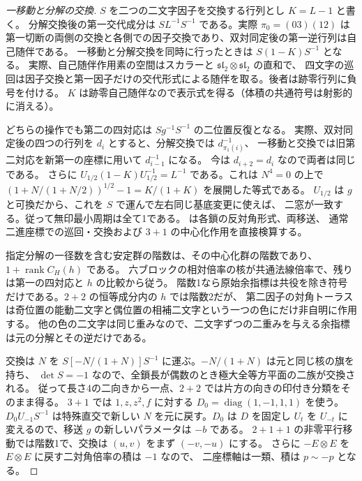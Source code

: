 \begin{proof}[一移動と分解の交換]
$S$ を二つの二文字因子を交換する行列とし $K=L-1$ と書く。
分解交換後の第一交代成分は $S L^{-1}S^{-1}$ である。実際 $\pi_0=(03)(12)$ は
第一切断の両側の交換と各側での因子交換であり、双対同定後の第一逆行列は自己随伴である。
一移動と分解交換を同時に行ったときは $S(1-K)S^{-1}$ となる。
実際、自己随伴作用素の空間はスカラーと $\mathfrak{sl}_2\otimes\mathfrak{sl}_2$ の直和で、
四文字の巡回は因子交換と第一因子だけの交代形式による随伴を取る。後者は跡零行列に負号を付ける。
$K$ は跡零自己随伴なので表示式を得る（体積の共通符号は射影的に消える）。

どちらの操作でも第二の四対応は $Sg^{-1}S^{-1}$ の二位置反復となる。
実際、双対同定後の四つの行列を $d_i$ とすると、分解交換では $d_{\pi_1(i)}^{-1}$、
一移動と交換では旧第二対応を新第一の座標に用いて $d_{i-1}^{-1}$ になる。
今は $d_{i+2}=d_i$ なので両者は同じである。
さらに $U_{1/2}(1-K)U_{1/2}^{-1}=L^{-1}$ である。これは $N^4=0$ の上で
$(1+N/(1+N/2))^{1/2}-1=K/(1+K)$ を展開した等式である。
$U_{1/2}$ は $g$ と可換だから、これを $S$ で運んで左右同じ基底変更に使えば、
二窓が一致する。従って無印最小周期は全て1である。
 は各鎖の反対角形式、両移送、
通常二進座標での巡回・交換および $3+1$ の中心化作用を直接検算する。

指定分解の一径数を含む安定群の階数は、その中心化群の階数であり、$1+\operatorname{rank}C_H(h)$ である。
六ブロックの相対倍率の核が共通法線倍率で、残りは第一の四対応と $h$ の比較から従う。
階数1なら原始余指標は共役を除き符号だけである。$2+2$ の恒等成分内の $h$ では階数2だが、
第二因子の対角トーラスは奇位置の能動二文字と偶位置の相補二文字という一つの色にだけ非自明に作用する。
他の色の二文字は同じ重みなので、二文字ずつの二重みを与える余指標は元の分解とその逆だけである。

交換は $N$ を $S[-N/(1+N)]S^{-1}$ に運ぶ。$-N/(1+N)$ は元と同じ核の旗を持ち、
$\det S=-1$ なので、全鎖長が偶数のとき極大全等方平面の二族が交換される。
従って長さ4の二向きから一点、$2+2$ では片方の向きの印付き分類をそのまま得る。
$3+1$ では $1,z,z^2,f$ に対する $D_0=\operatorname{diag}(1,-1,1,1)$ を使う。
$D_0 U_{-1}S^{-1}$ は特殊直交で新しい $N$ を元に戻す。$D_0$ は $D$ を固定し $U_t$ を
$U_{-t}$ に変えるので、移送 $g$ の新しいパラメータは $-b$ である。
$2+1+1$ の非零平行移動では階数1で、交換は $(u,v)$ をまず $(-v,-u)$ にする。
さらに $-E\otimes E$ を $E\otimes E$ に戻す二対角倍率の積は $-1$ なので、
二座標軸は一類、積は $p\sim-p$ となる。
\end{proof}

